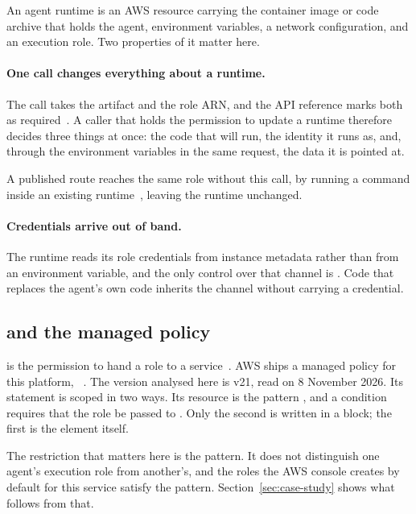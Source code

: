An \agentcore agent runtime is an AWS resource carrying the container image
or code archive that holds the agent, environment variables, a network
configuration, and an execution role. Two properties of it matter here.

\paragraph{One call changes everything about a runtime.}
The  call takes the artifact and
the role ARN, and the API
reference marks both as required~\cite{awsAgentCoreUpdateRuntime}. A caller that holds the permission to update
a runtime therefore decides three things at once: the code that will run, the
identity it runs as, and, through the environment variables in the same
request, the data it is pointed at.

A published route reaches the same role without this call, by running a
command inside an existing runtime~\cite{garcia2026agentcorepaths}, leaving
the runtime unchanged.

\paragraph{Credentials arrive out of band.}
The runtime reads its role credentials from instance metadata rather than from
an environment variable, and the only control over that channel is
. Code that
replaces the agent's own code inherits the channel without carrying a
credential.

\subsection{ and the managed policy}

 is the permission to hand a role to a
service~\cite{awsPassRole}. AWS ships a managed policy for this platform,
~\cite{awsBedrockAgentCoreFullAccess}. The version analysed here is v21, read on 8 November 2026. Its
 statement is scoped in two ways. Its resource is the
pattern ,
and a condition requires that the role be passed to
. Only the second is written in a
 block; the first is the  element itself.

The restriction that matters here is the pattern. It does not distinguish one agent's
execution role from another's, and the roles the AWS console creates by default
for this service satisfy the pattern. Section~\ref{sec:case-study} shows what
follows from that.


